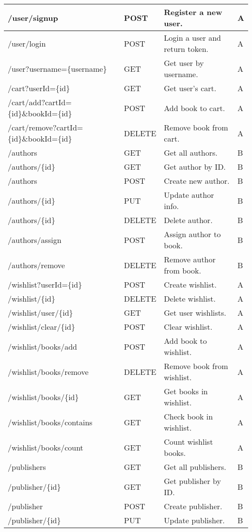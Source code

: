 \begin{longtable}{|p{}|p{} |p{}|p{}|}
/user/signup & POST & Register a new user. & A \\
\hline
/user/login & POST & Login a user and return token. & A \\
\hline
/user?username=\{username\} & GET & Get user by username. & A \\
\hline
/cart?userId=\{id\} & GET & Get user’s cart. & A \\
\hline
/cart/add?cartId=\{id\}\&bookId=\{id\} & POST & Add book to cart. & A \\
\hline
/cart/remove?cartId=\{id\}\&bookId=\{id\} & DELETE & Remove book from cart. & A \\
\hline
/authors & GET & Get all authors. & B \\
\hline
/authors/\{id\} & GET & Get author by ID. & B \\
\hline
/authors & POST & Create new author. & B \\
\hline
/authors/\{id\} & PUT & Update author info. & B \\
\hline
/authors/\{id\} & DELETE & Delete author. & B \\
\hline
/authors/assign & POST & Assign author to book. & B \\
\hline
/authors/remove & DELETE & Remove author from book. & B \\
\hline
/wishlist?userId=\{id\} & POST & Create wishlist. & A \\
\hline
/wishlist/\{id\} & DELETE & Delete wishlist. & A \\
\hline
/wishlist/user/\{id\} & GET & Get user wishlists. & A \\
\hline
/wishlist/clear/\{id\} & POST & Clear wishlist. & A \\
\hline
/wishlist/books/add & POST & Add book to wishlist. & A \\
\hline
/wishlist/books/remove & DELETE & Remove book from wishlist. & A \\
\hline
/wishlist/books/\{id\} & GET & Get books in wishlist. & A \\
\hline
/wishlist/books/contains & GET & Check book in wishlist. & A \\
\hline
/wishlist/books/count & GET & Count wishlist books. & A \\
\hline
/publishers & GET & Get all publishers. & B \\
\hline
/publisher/\{id\} & GET & Get publisher by ID. & B \\
\hline
/publisher & POST & Create publisher. & B \\
\hline
/publisher/\{id\} & PUT & Update publisher. & B \\

\end{longtable}
